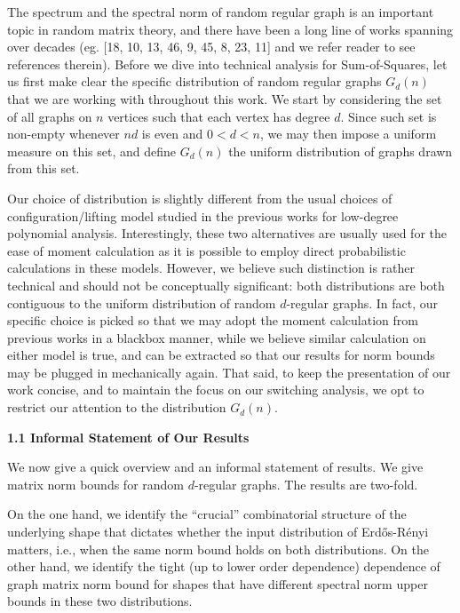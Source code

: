 The spectrum and the spectral norm of random regular graph is an important topic in random matrix theory, and there have been a long line of works spanning over decades (eg. [18, 10, 13, 46, 9, 45, 8, 23, 11] and we refer reader to see references therein).
Before we dive into technical analysis for Sum-of-Squares, let us first make clear the specific distribution of random regular graphs $G_{d}(n)$ that we are working with throughout this work. We start by considering the set of all graphs on $n$ vertices such that each vertex has degree $d$. Since such set is non-empty whenever $nd$ is even and $0<d<n$, we may then impose a uniform measure on this set, and define $G_{d}(n)$ the uniform distribution of graphs drawn from this set.\par




Our choice of distribution is slightly different from the usual choices of configuration/lifting model studied in the previous works for low-degree polynomial analysis. Interestingly, these two alternatives are usually used for the ease of moment calculation as it is possible to employ direct probabilistic calculations in these models. However, we believe such distinction is rather technical and should not be conceptually significant:
both distributions are both contiguous to the uniform distribution of random $d$-regular graphs. In fact, our specific choice is picked so that we may adopt the moment calculation from previous works in a blackbox manner, while we believe similar calculation on either model is true, and can be extracted so that our results for norm bounds may be plugged in mechanically again. That said, to keep the presentation of our work concise, and to maintain the focus on our switching analysis, we opt to restrict our attention to the distribution $G_{d}(n)$.\par





\par\medskip\noindent\textbf{
1.1 Informal Statement of Our Results}\par




We now give a quick overview and an informal statement of results. We give matrix norm bounds for random $d$-regular graphs. The results are two-fold.\par




On the one hand, we identify the “crucial” combinatorial structure of the underlying shape that dictates whether the input distribution of Erdős-Rényi matters, i.e., when the same norm bound holds on both distributions. On the other hand, we identify the tight (up to lower order dependence) dependence of graph matrix norm bound for shapes that have different spectral norm upper bounds in these two distributions.\par



